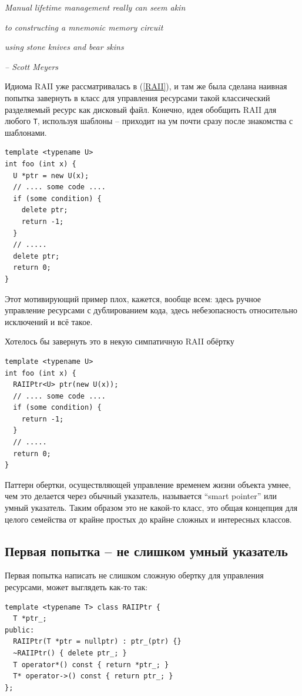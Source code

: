 \documentclass[a4paper,12pt,oneside]{book}
\begin{document}
\hfill\textit{Manual lifetime management really can seem akin}

\hfill\textit{to constructing a mnemonic memory circuit}

\hfill\textit{using stone knives and bear skins}{\vspace{0.5em}}

\hfill\textit{-- Scott Meyers}

Идиома RAII уже рассматривалась в (\ref{RAII}), и там же была сделана наивная попытка завернуть в класс для управления ресурсами такой классический разделяемый ресурс как дисковый файл. Конечно, идея обобщить RAII для любого \lstinline!T!, используя шаблоны -- приходит на ум почти сразу после знакомства с шаблонами.

\begin{lstlisting}
template <typename U>
int foo (int x) {
  U *ptr = new U(x);
  // .... some code ....
  if (some condition) {
    delete ptr; 
    return -1;
  }
  // .....
  delete ptr;
  return 0;
}
\end{lstlisting}

Этот мотивирующий пример плох, кажется, вообще всем: здесь ручное управление ресурсами с дублированием кода, здесь небезопасность относительно исключений и всё такое.

Хотелось бы завернуть это в некую симпатичную RAII обёртку

\begin{lstlisting}
template <typename U>
int foo (int x) {
  RAIIPtr<U> ptr(new U(x));
  // .... some code ....
  if (some condition) {
    return -1;
  }
  // .....
  return 0;
}
\end{lstlisting}

Паттерн обертки, осуществляющей управление временем жизни объекта умнее, чем это делается через обычный указатель, называется ``smart pointer'' или умный указатель. Таким образом это не какой-то класс, это общая концепция для целого семейства от крайне простых до крайне сложных и интересных классов.

\subsection{Первая попытка -- не слишком умный указатель}

Первая попытка написать не слишком сложную обертку для управления ресурсами, может выглядеть как-то так:

\begin{lstlisting}
template <typename T> class RAIIPtr {
  T *ptr_;
public:
  RAIIPtr(T *ptr = nullptr) : ptr_(ptr) {}
  ~RAIIPtr() { delete ptr_; }
  T operator*() const { return *ptr_; }
  T* operator->() const { return ptr_; }
};
\end{lstlisting}
\end{document}
